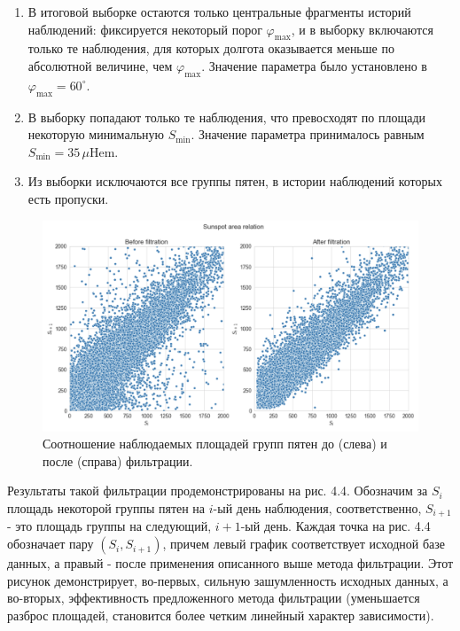 \documentclass[a4paper, 12pt]{article}
\begin{document}
\begin{enumerate}
    \item В итоговой выборке остаются только центральные фрагменты историй наблюдений: фиксируется некоторый порог $\varphi_\text{max}$, и в выборку включаются только те наблюдения, для которых долгота оказывается меньше по абсолютной величине, чем $\varphi_\text{max}$. Значение параметра было установлено в $\varphi_\text{max} = 60^\circ$.
    \item В выборку попадают только те наблюдения, что превосходят по площади некоторую минимальную $S_\text{min}$. Значение параметра принималось равным $S_\text{min} = 35 \, \mu\text{Hem}$.
    \item Из выборки исключаются все группы пятен, в истории наблюдений которых есть пропуски.
\end{enumerate}

\begin{figure}[H]
    \centering
    \includegraphics[width=17cm]{area_relation.png}
    \caption{Соотношение наблюдаемых площадей групп пятен до (слева) и после (справа) фильтрации.}
    \label{fig:my_label}
\end{figure}{}

Результаты такой фильтрации продемонстрированы на рис. 4.4. Обозначим за $S_i$ площадь некоторой группы пятен на $i$-ый день наблюдения, соответственно, $S_{i+1}$ - это площадь группы на следующий, $i+1$-ый день. Каждая точка на рис. 4.4 обозначает пару $(S_i, S_{i+1})$, причем левый график соответствует исходной базе данных, а правый - после применения описанного выше метода фильтрации. Этот рисунок демонстрирует, во-первых, сильную зашумленность исходных данных, а во-вторых, эффективность предложенного метода фильтрации (уменьшается разброс площадей, становится более четким линейный характер зависимости).
\end{document}

